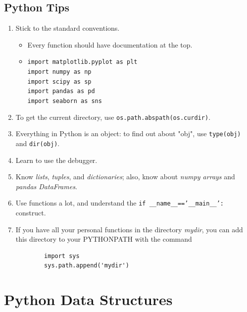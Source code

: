 \subsection{Python Tips}

\begin{enumerate}
  \item Stick to the standard conventions.
      \begin{itemize}
        \item Every function should have documentation at the top.
        \item \texttt{import matplotlib.pyplot as plt}\\
            \texttt{import numpy as np}\\
            \texttt{import scipy as sp}\\
            \texttt{import pandas as pd}\\
            \texttt{import seaborn as sns}
      \end{itemize}
  \item To get the current directory, use \texttt{os.path.abspath(os.curdir)}.
  \item Everything in Python is an object: to find out about "obj", use \texttt{type(obj)} and \texttt{dir(obj)}.
  \item Learn to use the debugger.
  \item Know \emph{lists}, \emph{tuples}, and \emph{dictionaries}; also, know about \emph{numpy arrays} and \emph{pandas DataFrames}.
  \item Use functions a lot, and understand the \texttt{if \_\_name\_\_=='\_\_main\_\_':} construct.
  \item If you have all your personal functions in the directory \emph{mydir}, you can add this directory to your PYTHONPATH with the command
      \begin{lstlisting}
        import sys
        sys.path.append('mydir')
      \end{lstlisting}
\end{enumerate}

\section{Python Data Structures}

